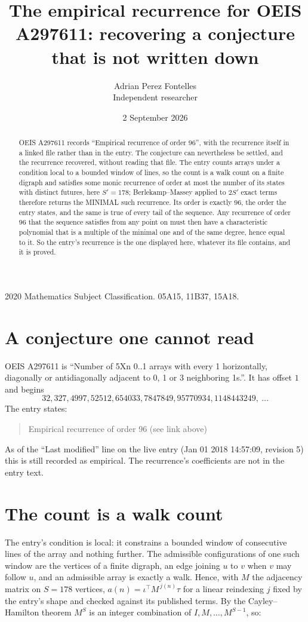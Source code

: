 \documentclass[11pt,a4paper]{article}
\title{The empirical recurrence for OEIS A297611: recovering a conjecture that is not written down}
\author{Adrian Perez Fontelles\\ \small Independent researcher}
\date{2 September 2026}
\theoremstyle{plain}
\theoremstyle{definition}
\begin{document}
\maketitle

\begin{abstract}
OEIS A297611 records ``Empirical recurrence of order $96$'', with the recurrence itself in a
linked file rather than in the entry. The conjecture can nevertheless be settled, and the
recurrence recovered, without reading that file. The entry counts arrays under a condition
local to a bounded window of lines, so the count is a walk count on a finite digraph and
satisfies some monic recurrence of order at most the number of its states with distinct
futures, here $S'=178$; Berlekamp--Massey applied to $2S'$ exact
terms therefore returns the MINIMAL such recurrence. Its order is exactly $96$, the order
the entry states, and the same is true of every tail of the sequence. Any recurrence of order
$96$ that the sequence satisfies from any point on must then have a characteristic
polynomial that is a multiple of the minimal one and of the same degree, hence equal to it. So
the entry's recurrence is the one displayed here, whatever its file contains, and it is
proved.
\end{abstract}

\noindent\small 2020 Mathematics Subject Classification. 05A15, 11B37, 15A18.\normalsize

\section{A conjecture one cannot read}

OEIS A297611 is ``Number of 5Xn 0..1 arrays with every 1 horizontally, diagonally or antidiagonally adjacent to 0, 1 or 3 neighboring 1s.''. It has offset $1$ and begins
\[
32, 327, 4997, 52512, 654033, 7847849, 95770934, 1148443249,\ \dots
\]
The entry states:
\begin{quote}
Empirical recurrence of order 96 (see link above)
\end{quote}
As of the ``Last modified'' line on the live entry (Jan 01 2018 14:57:09, revision 5) this is still
recorded as empirical. The recurrence's coefficients are not in the entry text.

\section{The count is a walk count}

The entry's condition is local: it constrains a bounded window of consecutive lines of the
array and nothing further. The admissible configurations of one such window are the vertices
of a finite digraph, an edge joining $u$ to $v$ when $v$ may follow $u$, and an admissible
array is exactly a walk. Hence, with $M$ the adjacency matrix on $S=178$ vertices,
$a(n)=\iota^{\!\top}M^{\,j(n)}\tau$ for a linear reindexing $j$ fixed by the entry's shape
and checked against its published terms. By the Cayley--Hamilton theorem $M^{S}$ is an
integer combination of $I,M,\dots,M^{S-1}$, so:
\end{document}
